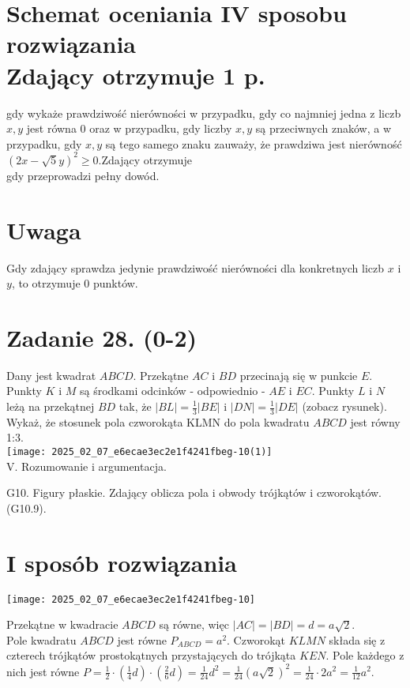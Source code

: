 \documentclass[10pt]{article}
\begin{document}
\section*{Schemat oceniania IV sposobu rozwiązania \\
 Zdający otrzymuje 1 p.}
 gdy wykaże prawdziwość nierówności w przypadku, gdy co najmniej jedna z liczb $x, y$ jest równa 0 oraz w przypadku, gdy liczby $x, y$ są przeciwnych znaków, a w przypadku, gdy $x, y$ są tego samego znaku zauważy, że prawdziwa jest nierówność $(2 x-\sqrt{5} y)^{2} \geq 0$.Zdający otrzymuje\\
gdy przeprowadzi pełny dowód.

\section*{Uwaga}
Gdy zdający sprawdza jedynie prawdziwość nierówności dla konkretnych liczb $x$ i $y$, to otrzymuje 0 punktów.

\section*{Zadanie 28. (0-2)}
Dany jest kwadrat $A B C D$. Przekątne $A C$ i $B D$ przecinają się w punkcie $E$. Punkty $K$ i $M$ są środkami odcinków - odpowiednio - $A E$ i $E C$. Punkty $L$ i $N$ leżą na przekątnej $B D$ tak, że $|B L|=\frac{1}{3}|B E|$ i $|D N|=\frac{1}{3}|D E|$ (zobacz rysunek). Wykaż, że stosunek pola czworokąta KLMN do pola kwadratu $A B C D$ jest równy 1:3.\\
\texttt{[image: 2025\_02\_07\_e6ecae3ec2e1f4241fbeg-10(1)]}\\
V. Rozumowanie i argumentacja.

G10. Figury płaskie. Zdający oblicza pola i obwody trójkątów i czworokątów. (G10.9).

\section*{I sposób rozwiązania}
\begin{center}
\texttt{[image: 2025\_02\_07\_e6ecae3ec2e1f4241fbeg-10]}
\end{center}

Przekątne w kwadracie $A B C D$ są równe, więc $|A C|=|B D|=d=a \sqrt{2}$.\\
Pole kwadratu $A B C D$ jest równe $P_{A B C D}=a^{2}$. Czworokąt $K L M N$ składa się z czterech trójkątów prostokątnych przystających do trójkąta $K E N$. Pole każdego z nich jest równe $P=\frac{1}{2} \cdot\left(\frac{1}{4} d\right) \cdot\left(\frac{2}{6} d\right)=\frac{1}{24} d^{2}=\frac{1}{24}(a \sqrt{2})^{2}=\frac{1}{24} \cdot 2 a^{2}=\frac{1}{12} a^{2}$.
\end{document}
